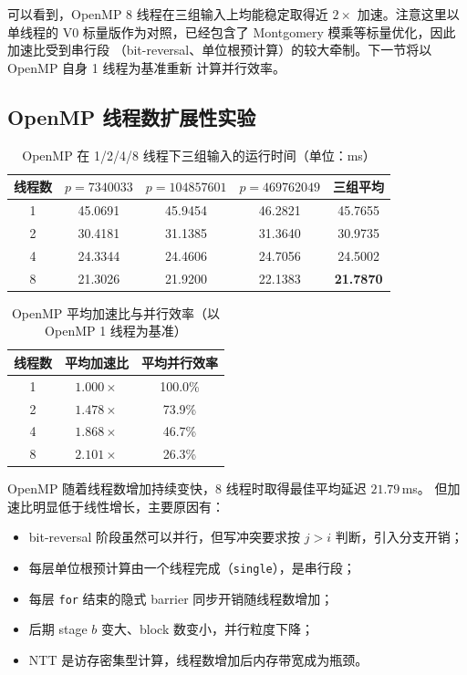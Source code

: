 \documentclass[UTF8,a4paper,10pt]{ctexart}
\begin{document}
可以看到，OpenMP 8 线程在三组输入上均能稳定取得近 $2\times$ 加速。注意这里以单线程的
V0 标量版作为对照，已经包含了 Montgomery 模乘等标量优化，因此加速比受到串行段
（bit-reversal、单位根预计算）的较大牵制。下一节将以 OpenMP 自身 1 线程为基准重新
计算并行效率。

\subsection{OpenMP 线程数扩展性实验}

\begin{table}[H]
  \centering
  \begin{tabular}{ccccc}
  \toprule  
  \textbf{线程数} & $p=7340033$ & $p=104857601$ & $p=469762049$ & \textbf{三组平均}\\
  \midrule
  1 & 45.0691 & 45.9454 & 46.2821 & 45.7655 \\
  2 & 30.4181 & 31.1385 & 31.3640 & 30.9735 \\
  4 & 24.3344 & 24.4606 & 24.7056 & 24.5002 \\
  8 & 21.3026 & 21.9200 & 22.1383 & \textbf{21.7870} \\
  \bottomrule
  \end{tabular}
  \caption{OpenMP 在 1/2/4/8 线程下三组输入的运行时间（单位：ms）}
  \label{tab:omp-scale}
\end{table}

\begin{table}[H]
  \centering
  \begin{tabular}{ccc}
  \toprule  
  \textbf{线程数} & \textbf{平均加速比} & \textbf{平均并行效率}\\
  \midrule
  1 & $1.000\times$ & 100.0\% \\
  2 & $1.478\times$ & 73.9\%  \\
  4 & $1.868\times$ & 46.7\%  \\
  8 & $2.101\times$ & 26.3\%  \\
  \bottomrule
  \end{tabular}
  \caption{OpenMP 平均加速比与并行效率（以 OpenMP 1 线程为基准）}
  \label{tab:omp-speedup}
\end{table}

OpenMP 随着线程数增加持续变快，8 线程时取得最佳平均延迟 $21.79$\,ms。
但加速比明显低于线性增长，主要原因有：

\begin{itemize}
  \item bit-reversal 阶段虽然可以并行，但写冲突要求按 $j > i$ 判断，引入分支开销；
  \item 每层单位根预计算由一个线程完成（\texttt{single}），是串行段；
  \item 每层 \texttt{for} 结束的隐式 barrier 同步开销随线程数增加；
  \item 后期 stage $b$ 变大、block 数变小，并行粒度下降；
  \item NTT 是访存密集型计算，线程数增加后内存带宽成为瓶颈。
\end{itemize}
\end{document}
